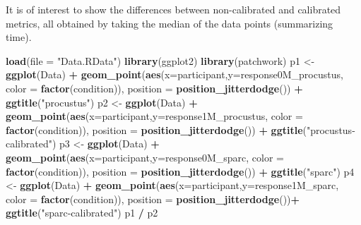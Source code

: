 \documentclass[
]{article}
\newenvironment{Shaded}{\begin{snugshade}}{\end{snugshade}}
\newcommand{\AttributeTok}[1]{\textcolor[rgb]{0.13,0.29,0.53}{#1}}
\newcommand{\FunctionTok}[1]{\textcolor[rgb]{0.13,0.29,0.53}{\textbf{#1}}}
\newcommand{\NormalTok}[1]{#1}
\newcommand{\OtherTok}[1]{\textcolor[rgb]{0.56,0.35,0.01}{#1}}
\newcommand{\SpecialCharTok}[1]{\textcolor[rgb]{0.81,0.36,0.00}{\textbf{#1}}}
\newcommand{\StringTok}[1]{\textcolor[rgb]{0.31,0.60,0.02}{#1}}
\begin{document}
It is of interest to show the differences between non-calibrated and
calibrated metrics, all obtained by taking the median of the data points
(summarizing time).

\begin{Shaded}
\begin{Highlighting}[]
\FunctionTok{load}\NormalTok{(}\AttributeTok{file =} \StringTok{"Data.RData"}\NormalTok{)}
\FunctionTok{library}\NormalTok{(ggplot2)}
\FunctionTok{library}\NormalTok{(patchwork)}
\NormalTok{p1 }\OtherTok{\textless{}{-}} \FunctionTok{ggplot}\NormalTok{(Data) }\SpecialCharTok{+}
  \FunctionTok{geom\_point}\NormalTok{(}\FunctionTok{aes}\NormalTok{(}\AttributeTok{x=}\NormalTok{participant,}\AttributeTok{y=}\NormalTok{response0M\_procustus, }\AttributeTok{color =} \FunctionTok{factor}\NormalTok{(condition)), }\AttributeTok{position =} \FunctionTok{position\_jitterdodge}\NormalTok{()) }\SpecialCharTok{+}
  \FunctionTok{ggtitle}\NormalTok{(}\StringTok{"procustus"}\NormalTok{)}
\NormalTok{p2 }\OtherTok{\textless{}{-}} \FunctionTok{ggplot}\NormalTok{(Data) }\SpecialCharTok{+}
  \FunctionTok{geom\_point}\NormalTok{(}\FunctionTok{aes}\NormalTok{(}\AttributeTok{x=}\NormalTok{participant,}\AttributeTok{y=}\NormalTok{response1M\_procustus, }\AttributeTok{color =} \FunctionTok{factor}\NormalTok{(condition)), }\AttributeTok{position =} \FunctionTok{position\_jitterdodge}\NormalTok{()) }\SpecialCharTok{+}
  \FunctionTok{ggtitle}\NormalTok{(}\StringTok{"procustus{-}calibrated"}\NormalTok{)}
\NormalTok{p3 }\OtherTok{\textless{}{-}} \FunctionTok{ggplot}\NormalTok{(Data) }\SpecialCharTok{+}
  \FunctionTok{geom\_point}\NormalTok{(}\FunctionTok{aes}\NormalTok{(}\AttributeTok{x=}\NormalTok{participant,}\AttributeTok{y=}\NormalTok{response0M\_sparc, }\AttributeTok{color =} \FunctionTok{factor}\NormalTok{(condition)), }\AttributeTok{position =} \FunctionTok{position\_jitterdodge}\NormalTok{()) }\SpecialCharTok{+}
  \FunctionTok{ggtitle}\NormalTok{(}\StringTok{"sparc"}\NormalTok{)}
\NormalTok{p4 }\OtherTok{\textless{}{-}} \FunctionTok{ggplot}\NormalTok{(Data) }\SpecialCharTok{+}
  \FunctionTok{geom\_point}\NormalTok{(}\FunctionTok{aes}\NormalTok{(}\AttributeTok{x=}\NormalTok{participant,}\AttributeTok{y=}\NormalTok{response1M\_sparc, }\AttributeTok{color =} \FunctionTok{factor}\NormalTok{(condition)), }\AttributeTok{position =} \FunctionTok{position\_jitterdodge}\NormalTok{())}\SpecialCharTok{+}
  \FunctionTok{ggtitle}\NormalTok{(}\StringTok{"sparc{-}calibrated"}\NormalTok{)}
\NormalTok{p1 }\SpecialCharTok{/}\NormalTok{ p2}
\end{Highlighting}
\end{Shaded}
\end{document}
